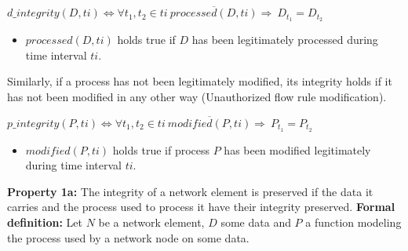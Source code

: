 \begin{myformula}
$d\_integrity(D,ti) \Leftrightarrow \forall t_1,t_2\in ti ~ \overline{processed(D, ti)} \Rightarrow 
~D_{t_1}=D_{t_2}$ 
\end{myformula}

\begin{itemize}
\item $processed(D, ti)$ holds true if $D$ has been legitimately processed during time interval $ti$.

\end{itemize}

Similarly, if a process has not been legitimately modified, its integrity holds if it has not been modified in any other way (\eg Unauthorized flow rule modification). 

\begin{myformula}
$p\_integrity(P, ti) \Leftrightarrow \forall t_1,t_2 \in ti~ \overline{modified(P, ti)}\Rightarrow 
~P_{t_1}=P_{t_2}$
\end{myformula}

\begin{itemize}
\item $modified(P,ti)$ holds true if process $P$ has been modified legitimately during time interval $ti$.
\end{itemize}


\textbf{Property 1a:} The integrity of a network element is preserved if the data it carries and the process used to process it have their integrity preserved. 
\newline
\textbf{Formal definition:} Let $N$ be a network element, $D$ some data and $P$ a function modeling the process used by a network node on some data.

